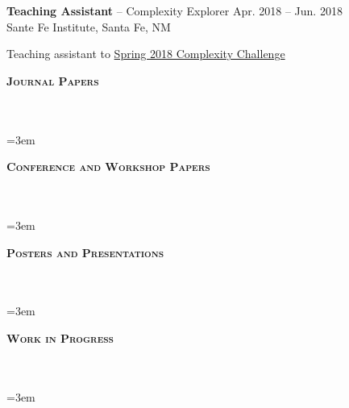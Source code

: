 \documentclass{article}
\newcommand{\header}[1]{{
\hspace*{-15pt}\vspace*{6pt} \textbf{\textsc{\large{#1}}}} \vspace*{-6pt} 
\lineunder
}
\newcommand{\lineunder}{
\vspace*{-8pt} \\ \hspace*{-15pt} 
\hrulefill \\
}
\newcommand{\employer}[4]{{
\vspace*{2pt}%
\textbf{#1} #2 \hfill #3\\ #4 \vspace*{2pt}}
}
\renewcommand{\labelitemii}{
$\vcenter{\hbox{\tiny$\bullet$}}$\hspace*{-3pt}
}
\newenvironment{bullet-list-minor}{
\begin{list}{\labelitemii}{\setlength\leftmargin{15pt} 
\topsep 0pt \itemsep -2pt}}{\vspace*{4pt}\end{list}
}
\begin{document}
    \employer{Teaching Assistant}{-- Complexity Explorer}{Apr. 2018 -- Jun. 2018}{Sante Fe Institute, Santa Fe, NM}
	\begin{bullet-list-minor}
        \item Teaching assistant to \href{https://www.complexityexplorer.org/challenges/2-spring-2018-complexity-challenge}{Spring 2018 Complexity Challenge}
    \end{bullet-list-minor}
    
    
\vspace*{4pt}%
\header{Journal Papers}

\nocite{*}
\newrefcontext[labelprefix=J]
\emergencystretch=3em
\printbibliography[heading=none,keyword={J}] 

\vspace*{4pt}%
\header{Conference and Workshop Papers}

\nocite{*}
\newrefcontext[labelprefix=C]
\emergencystretch=3em
\printbibliography[keyword={C},heading=none] 

\vspace*{4pt}%
\header{Posters and Presentations}

\nocite{*}
\newrefcontext[labelprefix=S]
\emergencystretch=3em
\printbibliography[keyword={S},heading=none] 

\vspace*{4pt}%
\header{Work in Progress}

\nocite{*}
\newrefcontext[labelprefix=M]
\emergencystretch=3em
\printbibliography[keyword=M,heading=none] 
%


\end{document}
